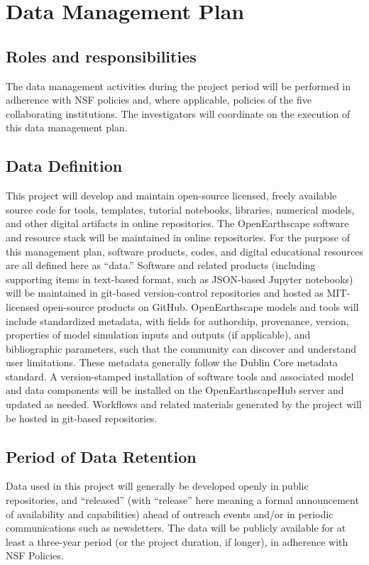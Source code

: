 \section*{Data Management Plan}
\nonumber

\subsection*{Roles and responsibilities}
The data management activities during the project period will be performed in adherence with NSF policies and, where applicable, policies of the five collaborating institutions. The investigators will coordinate on the execution of this data management plan.

\subsection*{Data Definition}

This project will develop and maintain open-source licensed, freely available source code for tools, templates, tutorial notebooks, libraries, numerical models, and other digital artifacts in online repositories. The OpenEarthscape software and resource stack will be maintained in online repositories. For the purpose of this management plan, software products, codes, and digital educational resources are all defined here as ``data.'' Software and related products (including supporting items in text-based format, such as JSON-based Jupyter notebooks) will be maintained in git-based version-control repositories and hosted as MIT-licensed open-source products on GitHub. OpenEarthscape models and tools will include standardized metadata, with fields for authorship, provenance, version, properties of model simulation inputs and outputs (if applicable), and bibliographic parameters, such that the community can discover and understand user limitations. These metadata generally follow the Dublin Core metadata standard. A version-stamped installation of software tools and associated model and data components will be installed on the OpenEarthscapeHub server and updated as needed. Workflows and related materials generated by the project will be hosted in git-based repositories.

\subsection*{Period of Data Retention}

Data used in this project will generally be developed openly in public repositories, and ``released'' (with ``release'' here meaning a formal announcement of availability and capabilities) ahead of outreach events and/or in periodic communications such as newsletters. The data will be publicly available for at least a three-year period (or the project duration, if longer), in adherence with NSF Policies. 

